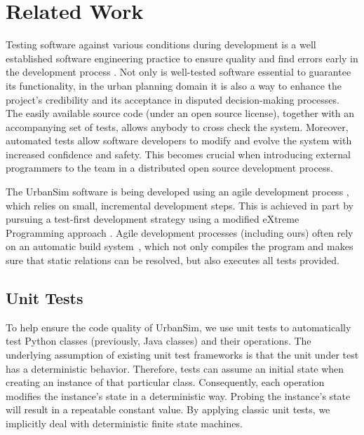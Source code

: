 \documentclass{sig-alternate-preprint}
\begin{document}
\section{Related Work}


Testing software against various conditions during development is a well 
established software engineering practice to ensure quality and find errors 
early in the development process \cite{mcgregor:2001,sommerville:2001}.  Not 
only is well-tested software essential to guarantee its functionality, 
in the urban planning domain it is
also a way to enhance the project's credibility and its acceptance in 
disputed decision-making processes. The easily available source code (under an 
open source license), together with an accompanying set of tests, allows 
anybody to cross check the system. Moreover, automated tests allow software 
developers to modify and evolve the system with increased confidence and 
safety. This becomes crucial when introducing external programmers to the team 
in a distributed open source development process. 


The UrbanSim software is being developed using an agile development process
\cite{beck:2000}, which relies on small, incremental development steps.  This
is achieved in part by pursuing a test-first development strategy using a
modified eXtreme Programming approach \cite{beck:2003}.  
Agile development processes (including
ours) often rely on an automatic build system~\cite{fowler:2006}, which not
only compiles the program and makes sure that static relations can be
resolved, but also executes all tests provided.

\newpage

\subsection{Unit Tests}
\label{related-work-unit-tests}

To help ensure the code quality of UrbanSim, we use unit tests 
\cite{beckgamma,hunt:2003,Noonan:2002} to automatically 
test Python classes (previously, Java classes) and their operations.
The underlying assumption of 
existing unit test frameworks is that the unit under test
has a deterministic behavior. Therefore, tests can assume an initial 
state when creating an instance of that particular class. Consequently, each 
operation modifies the instance's state in a deterministic way. Probing the 
instance's state will result in a repeatable constant value. By applying 
classic unit tests, 
we implicitly deal with deterministic finite state machines.
\end{document}
